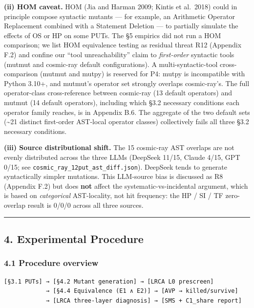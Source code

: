 \documentclass[review,12pt,authoryear]{elsarticle}
\begin{document}
\textbf{(ii) HOM caveat.} HOM (Jia and Harman 2009; Kintis et al.~2018)
could in principle compose syntactic mutants --- for example, an
Arithmetic Operator Replacement combined with a Statement Deletion ---
to partially simulate the effects of OS or HP on some PUTs. The §5
empirics did not run a HOM comparison; we list HOM equivalence testing
as residual threat R12 (Appendix F.2) and confine our ``tool
unreachability'' claim to \emph{first-order} syntactic tools (mutmut and
cosmic-ray default configurations). A multi-syntactic-tool
cross-comparison (mutmut and mutpy) is reserved for P4: mutpy is
incompatible with Python 3.10+, and mutmut's operator set strongly
overlaps cosmic-ray's. The full operator-class cross-reference between
cosmic-ray (13 default operators) and mutmut (14 default operators),
including which §3.2 necessary conditions each operator family reaches,
is in Appendix B.6. The aggregate of the two default sets
(\textasciitilde21 distinct first-order AST-local operator classes)
collectively fails all three §3.2 necessary conditions.

\textbf{(iii) Source distributional shift.} The 15 cosmic-ray AST
overlaps are not evenly distributed across the three LLMs (DeepSeek
11/15, Claude 4/15, GPT 0/15; see
\texttt{cosmic\_ray\_12put\_ast\_diff.json}). DeepSeek tends to generate
syntactically simpler mutations. This LLM-source bias is discussed as R8
(Appendix F.2) but does \textbf{not} affect the systematic-vs-incidental
argument, which is based on \emph{categorical} AST-locality, not hit
frequency: the HP / SI / TF zero-overlap result is 0/0/0 across all
three sources.

\begin{center}\rule{0.5\linewidth}{0.5pt}\end{center}

\subsection{4. Experimental Procedure}\label{experimental-procedure}

\subsubsection{4.1 Procedure overview}\label{procedure-overview}

\begin{verbatim}
[§3.1 PUTs] → [§4.2 Mutant generation] → [LRCA L0 prescreen]
            → [§4.4 Equivalence (E1 ∧ E2)] → [AVP → killed/survive]
            → [LRCA three-layer diagnosis] → [SMS + C1_share report]
\end{verbatim}
\end{document}
